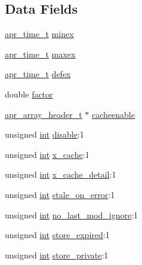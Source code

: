 \subsection*{Data Fields}
\begin{DoxyCompactItemize}
\item 
\hyperlink{group__apr__time_gadb4bde16055748190eae190c55aa02bb}{apr\+\_\+time\+\_\+t} \hyperlink{structcache__dir__conf_ae826bdd2dcceba1eaaad2f0e2c4c03dd}{minex}
\item 
\hyperlink{group__apr__time_gadb4bde16055748190eae190c55aa02bb}{apr\+\_\+time\+\_\+t} \hyperlink{structcache__dir__conf_aadeed9d55f51801b3285bba8db1b97bb}{maxex}
\item 
\hyperlink{group__apr__time_gadb4bde16055748190eae190c55aa02bb}{apr\+\_\+time\+\_\+t} \hyperlink{structcache__dir__conf_aa403fec046cbb63a4b1d63a84d01dd89}{defex}
\item 
double \hyperlink{structcache__dir__conf_a90834f1fe07f1e899a23c81ef1dbd302}{factor}
\item 
\hyperlink{structapr__array__header__t}{apr\+\_\+array\+\_\+header\+\_\+t} $\ast$ \hyperlink{structcache__dir__conf_a12a954532411f0c7534f8b1d77e433f4}{cacheenable}
\item 
unsigned \hyperlink{pcre_8txt_a42dfa4ff673c82d8efe7144098fbc198}{int} \hyperlink{structcache__dir__conf_aff0b731349364c6d71d77508f1d2f3f1}{disable}\+:1
\item 
unsigned \hyperlink{pcre_8txt_a42dfa4ff673c82d8efe7144098fbc198}{int} \hyperlink{structcache__dir__conf_ac5838050752d7fa858225e27ffd68467}{x\+\_\+cache}\+:1
\item 
unsigned \hyperlink{pcre_8txt_a42dfa4ff673c82d8efe7144098fbc198}{int} \hyperlink{structcache__dir__conf_abda54785cf9e18f001ce2867dedf071c}{x\+\_\+cache\+\_\+detail}\+:1
\item 
unsigned \hyperlink{pcre_8txt_a42dfa4ff673c82d8efe7144098fbc198}{int} \hyperlink{structcache__dir__conf_a8fa201f55f9027f150b5a889464609c6}{stale\+\_\+on\+\_\+error}\+:1
\item 
unsigned \hyperlink{pcre_8txt_a42dfa4ff673c82d8efe7144098fbc198}{int} \hyperlink{structcache__dir__conf_a2d62e7cbdd19cfd978a17e186770f14d}{no\+\_\+last\+\_\+mod\+\_\+ignore}\+:1
\item 
unsigned \hyperlink{pcre_8txt_a42dfa4ff673c82d8efe7144098fbc198}{int} \hyperlink{structcache__dir__conf_a30192fcdd95d30467fb4b5e2016eeba8}{store\+\_\+expired}\+:1
\item 
unsigned \hyperlink{pcre_8txt_a42dfa4ff673c82d8efe7144098fbc198}{int} \hyperlink{structcache__dir__conf_a156a4127edc9cbcb7bbe80a76856e20b}{store\+\_\+private}\+:1

\end{DoxyCompactItemize}
